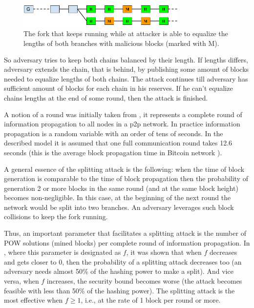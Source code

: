 \documentclass[10pt,a4paper]{article}
\numberwithin{equation}{section} %
\theoremstyle{plain}
\theoremstyle{definition}
\theoremstyle{remark}
\begin{document}
	\begin{figure}[h]
            \centering
            \includegraphics[width=0.75\textwidth]{split}
            \caption{The fork that keeps running while at attacker is able to equalize the lengths of both branches with malicious blocks (marked with M).}
            \label{fig:split}
    \end{figure}
	
	So adversary tries to keep both chains balanced by their length. If lengths differs, adversary extends the chain, that is behind, by publishing some amount of blocks needed to equalize lengths of both chains. The attack continues till adversary has sufficient amount of blocks for each chain in his reserves. If he can't equalize chains lengths at the end of some round, then the attack is finished.
	
	A notion of a round was initially taken from \cite{GKL15}, it represents a complete round of information propagation to all nodes in a p2p network. In practice information propagation is a random variable with an order of tens of seconds. In the described model it is assumed that one full communication round takes 12.6 seconds (this is the average block propagation time in Bitcoin network \cite{DW13}).
	
	A general essence of the splitting attack is the following: when the time of block generation is comparable to the time of block propagation then the probability of generation 2 or more blocks in the same round (and at the same block height) becomes non-negligible. In this case, at the beginning of the next round the network would be split into two branches. An adversary leverages such block collisions to keep the fork running.
	
	Thus, an important parameter that facilitates a splitting attack is the number of POW solutions (mined blocks) per complete round of information propagation. In \cite{KP15}, where this parameter is designated as \(f\), it was shown that when \(f\) decreases and gets closer to 0, then the probability of a splitting attack decreases too (an adversary needs almost 50\% of the hashing power to make a split). And vice versa, when \(f\) increases, the security bound becomes worse (the attack becomes feasible with less than 50\% of the hashing power). The splitting attack is the most effective when \(f \geq 1 \), i.e., at the rate of 1 block per round or more.
\end{document}
